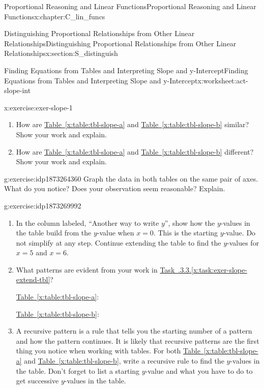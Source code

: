 \documentclass[oneside,10pt,]{book}
\newcommand{\xreffont}{\relax}
\numberwithin{equation}{chapter}
\begin{document}
\begin{chapterptx}{Proportional Reasoning and Linear Functions}{}{Proportional Reasoning and Linear Functions}{}{}{x:chapter:C_lin_funcs}
\begin{sectionptx}{Distinguishing Proportional Relationships from Other Linear Relationships}{}{Distinguishing Proportional Relationships from Other Linear Relationships}{}{}{x:section:S_distinguish}
\begin{worksheet-subsection}{Finding Equations from Tables and Interpreting Slope and y-Intercept}{}{Finding Equations from Tables and Interpreting Slope and y-Intercept}{}{}{x:worksheet:act-slope-int}
\begin{divisionexercise}{1}{}{}{x:exercise:exer-slope-1}
\begin{enumerate}[font=\bfseries,label=(\alph*),ref=\alph*]
\begin{sidebyside}{2}{0}{0}{0}
\end{sidebyside}%
\item{}How are \hyperref[x:table:tbl-slope-a]{Table~{\xreffont\ref{x:table:tbl-slope-a}}} and \hyperref[x:table:tbl-slope-b]{Table~{\xreffont\ref{x:table:tbl-slope-b}}} similar? Show your work and explain.%
\item{}How are \hyperref[x:table:tbl-slope-a]{Table~{\xreffont\ref{x:table:tbl-slope-a}}} and \hyperref[x:table:tbl-slope-b]{Table~{\xreffont\ref{x:table:tbl-slope-b}}} different? Show your work and explain.%
\end{enumerate}
\end{divisionexercise}%
\begin{divisionexercise}{2}{}{}{g:exercise:idp1873264360}%
Graph the data in both tables on the same pair of axes. What do you notice? Does your observation seem reasonable? Explain.%
\end{divisionexercise}%
\begin{divisionexercise}{3}{}{}{g:exercise:idp1873269992}%
\begin{enumerate}[font=\bfseries,label=(\alph*),ref=\alph*]
\item\label{x:task:exer-slope-extend-tbl}In the column labeled, ``Another way to write \(y\)'', show how the \(y\)-values in the table build from the \(y\)-value when \(x = 0\). This is the starting \(y\)-value. Do not simplify at any step. Continue extending the table to find the \(y\)-values for \(x = 5\) and \(x = 6\).%
\item{}What patterns are evident from your work in \hyperref[x:task:exer-slope-extend-tbl]{Task~{\xreffont 2.6.3.3}.{\xreffont\ref{x:task:exer-slope-extend-tbl}}}?%
\par
\hyperref[x:table:tbl-slope-a]{Table~{\xreffont\ref{x:table:tbl-slope-a}}}:%
\par
\hyperref[x:table:tbl-slope-b]{Table~{\xreffont\ref{x:table:tbl-slope-b}}}:%
\item{}A recursive pattern is a rule that tells you the starting number of a pattern and how the pattern continues. It is likely that recursive patterns are the first thing you notice when working with tables. For both \hyperref[x:table:tbl-slope-a]{Table~{\xreffont\ref{x:table:tbl-slope-a}}} and \hyperref[x:table:tbl-slope-b]{Table~{\xreffont\ref{x:table:tbl-slope-b}}}, write a recursive rule to find the \(y\)-values in the table. Don't forget to list a starting \(y\)-value and what you have to do to get successive \(y\)-values in the table.%
\par

\end{enumerate}
\end{divisionexercise}
\end{worksheet-subsection}
\end{sectionptx}
\end{chapterptx}
\end{document}
